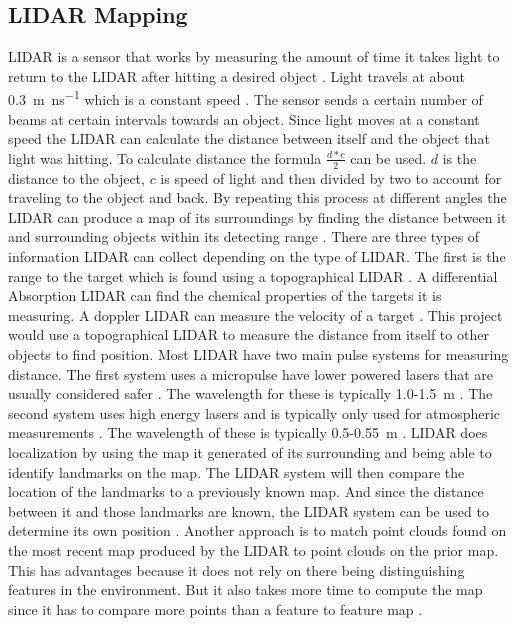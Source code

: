 \documentclass{article}
\begin{document}
  \subsection{LIDAR Mapping}
	LIDAR is a sensor that works by measuring the amount of time it takes light to return to the LIDAR after hitting a desired object \cite{keith_lidar_2007}. Light travels at about \SI{0.3}{\meter\per\nano\second} which is a constant speed \cite{keith_lidar_2007}. The sensor sends a certain number of beams at certain intervals towards an object. Since light moves at a constant speed the LIDAR can calculate the distance between itself and the object that light was hitting. To calculate distance the formula $\frac{d*c}{2}$ can be used. $d$ is the distance to the object, $c$ is speed of light and then divided by two to account for traveling to the object and back. By repeating this process at different angles the LIDAR can produce a map of its surroundings by finding the distance between it and surrounding objects within its detecting range \cite{keith_lidar_2007}.
	There are three types of information LIDAR can collect depending on the type of LIDAR. The first is the range to the target which is found using a topographical LIDAR \cite{keith_lidar_2007}. A differential Absorption LIDAR can find the chemical properties of the targets it is measuring. A doppler LIDAR can measure the velocity of a target \cite{keith_lidar_2007}. This project would use a topographical LIDAR to measure the distance from itself to other objects to find position.
  Most LIDAR have two main pulse systems for measuring distance. The first system uses a micropulse have lower powered lasers that are usually considered safer \cite{keith_lidar_2007}. The wavelength for these is typically 1.0-\SI{1.5}{\meter} \cite{lidar_uk_how_2017}. The second system uses high energy lasers and is typically only used for atmospheric measurements \cite{keith_lidar_2007}. The wavelength of these is typically 0.5-\SI{0.55}{\meter} \cite{lidar_uk_how_2017}.
	LIDAR does localization by using the map it generated of its surrounding and being able to identify landmarks on the map. The LIDAR system will then compare the location of the landmarks to a previously known map. And since the distance between it and those landmarks are known, the LIDAR system can be used to determine its own position \cite{schlichting_vehicle_2016}. Another approach is to match point clouds found on the most recent map produced by the LIDAR to point clouds on the prior map. This has advantages because it does not rely on there being distinguishing features in the environment. But it also takes more time to compute the map since it has to compare more points than a feature to feature map \cite{li_extracting_2010}.
\end{document}
